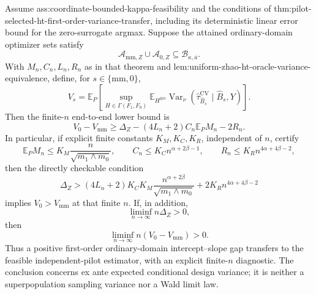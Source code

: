 Assume ass:coordinate-bounded-kappa-feasibility and the conditions of thm:pilot-selected-ht-first-order-variance-transfer, including its deterministic linear error bound for the zero-surrogate argmax.  Suppose the attained ordinary-domain optimizer sets satisfy
\[
\mathcal A_{\mathrm{mm},Z}\cup\mathcal A_{0,Z}
\subseteq\mathcal B_{\kappa,\overline a}.
\]
With \(M_n,C_n,L_n,R_n\) as in that theorem and lem:uniform-zhao-ht-oracle-variance-equivalence, define, for \(s\in\{\mathrm{mm},0\}\),
\[
V_s=
\mathbb E_P\left[
\sup_{H\in\Gamma(F_1,F_0)}
\mathbb E_{H^{\otimes n}}
\operatorname{Var}_\nu
(\widehat\tau_{\widehat B_s}^{\mathrm{CV}}\mid\widehat B_s,Y)
\right].
\]
Then the finite-\(n\) end-to-end lower bound is
\[
V_0-V_{\mathrm{mm}}
\ge
\Delta_Z-(4L_n+2)C_n\mathbb E_PM_n-2R_n.
\]
In particular, if explicit finite constants \(K_M,K_C,K_R\), independent of \(n\), certify
\[
\mathbb E_PM_n\le K_M\frac{n}{\sqrt{m_1\wedge m_0}},
\qquad
C_n\le K_Cn^{\alpha+2\beta-1},
\qquad
R_n\le K_Rn^{4\alpha+4\beta-2},
\]
then the directly checkable condition
\[
\Delta_Z>
(4L_n+2)K_CK_M
\frac{n^{\alpha+2\beta}}{\sqrt{m_1\wedge m_0}}
+2K_Rn^{4\alpha+4\beta-2}
\]
implies \(V_0>V_{\mathrm{mm}}\) at that finite \(n\).  If, in addition,
\[
\liminf_{n\to\infty}n\Delta_Z>0,
\]
then
\[
\liminf_{n\to\infty}n(V_0-V_{\mathrm{mm}})>0.
\]
Thus a positive first-order ordinary-domain intercept--slope gap transfers to the feasible independent-pilot estimator, with an explicit finite-\(n\) diagnostic.  The conclusion concerns ex ante expected conditional design variance; it is neither a superpopulation sampling variance nor a Wald limit law.